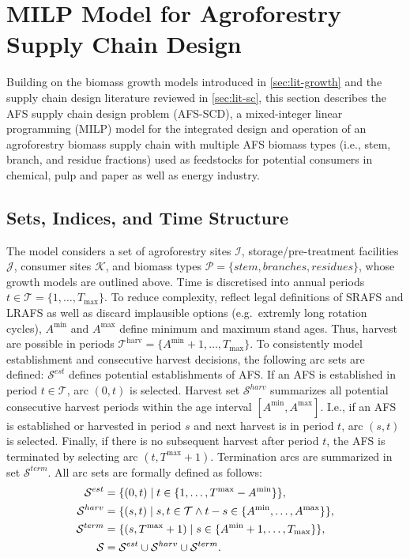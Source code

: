 \documentclass[APA,TimesLARGE]{WileyNJDv5} %
\newcommand{\Tc}{\mathcal{T}}
\newcommand{\Sc}{\mathcal{S}}
\renewcommand{\problem}{AFS-SCD}
\begin{document}
\section{MILP Model for Agroforestry Supply Chain Design}\label{sec:milp}

Building on the biomass growth models introduced in
\autoref{sec:lit-growth} and the supply chain design literature reviewed in
\autoref{sec:lit-sc}, this section describes the AFS supply chain
design problem (\problem), a mixed-integer linear programming (MILP)
model for the integrated design and operation of an agroforestry biomass
supply chain with multiple AFS biomass types (i.e., stem, branch,
and residue fractions) used as feedstocks for potential consumers in chemical, pulp and
paper as well as energy industry.

\subsection{Sets, Indices, and Time Structure}\label{sets-indices-and-time-structure}

The model considers a set of agroforestry sites \(\mathcal{I}\), storage/pre-treatment facilities \(\mathcal{J}\), consumer sites \(\mathcal{K}\), and biomass types \(\mathcal{P} = \{stem, branches, residues\}\), whose growth models are outlined above. Time is discretised into annual periods \(t \in \Tc = \{1,\dots,T_{\max}\}\). To reduce complexity, reflect legal definitions of SRAFS and LRAFS as well as discard implausible options (e.g.~extremly long rotation cycles), \(A^{\min}\) and \(A^{\max}\) define minimum and maximum stand ages. Thus, harvest are possible in periods \(\mathcal{T}^{\text{harv}} = \{A^{\min}+1,\dots,T_{\max}\}\). To consistently model establishment and consecutive harvest decisions, the following arc sets are defined: \(\Sc^{est}\) defines potential establishments of AFS. If an AFS is established in period \(t \in \Tc\), arc \((0,t)\) is selected. Harvest set \(\Sc^{harv}\) summarizes all potential consecutive harvest periods within the age interval \([A^{\min},A^{\max}]\). I.e., if an AFS is established or harvested in period \(s\) and next harvest is in period \(t\), arc \((s,t)\) is selected. Finally, if there is no subsequent harvest after period \(t\), the AFS is terminated by selecting arc \((t,T^{\max}+1)\). Termination arcs are summarized in set \(\Sc^{term}\). All arc sets are formally defined as
follows: \begin{align}
  \Sc^{{est}}  &= \{(0,t) \mid t \in \{1,\dots,T^{\max}-A^{\min}\}\}, \notag\\
  \Sc^{{harv}} &= \{(s,t) \mid s,t \in \Tc \wedge t-s \in \{A^{\min},\dots,A^{\max}\}\},  \notag\\
  \Sc^{{term}} &= \{(s,T^{\max}+1) \mid s \in \{A^{\min}+1,\dots,T_{\max}\}\}, \notag\\
  \Sc               &= \Sc^{{est}} \cup \Sc^{{harv}} \cup \Sc^{{term}}. \notag
\end{align}
\end{document}
